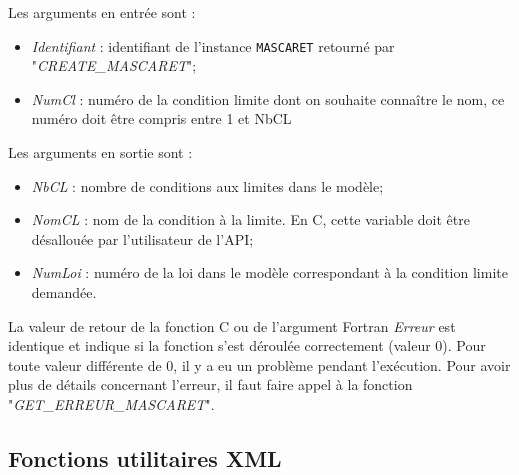 \documentclass[a4paper,11pt]{article}
\begin{document}
  Les arguments en entr\'ee sont :
 
 \vspace{0.5cm}
 
 \begin{itemize}
 
    \item \textit{Identifiant} : identifiant de l'instance \texttt{MASCARET} retourn\'e par "\textit{CREATE\_MASCARET}";
    
    \vspace{0.5cm}
    
    \item \textit{NumCl} : num\'ero de la condition limite dont on souhaite conna\^itre le nom, ce num\'ero doit \^etre compris entre 1 et NbCL
    
 \end{itemize}
 
 \vspace{0.5cm}
 
 Les arguments en sortie sont :

  \vspace{0.5cm}

  \begin{itemize}
  
     \item \textit{NbCL} : nombre de conditions aux limites dans le mod\`ele;
     \vspace{0.5cm}
     \item \textit{NomCL} : nom de la condition \`a la limite. En C, cette variable doit \^etre d\'esallou\'ee par l'utilisateur de l'API;  
     \vspace{0.5cm}
     \item \textit{NumLoi} : num\'ero de la loi dans le mod\`ele correspondant \`a la condition limite demand\'ee.  
     \vspace{0.5cm}
  \end{itemize}
  
  \vspace{0.5cm}
  
  La valeur de retour de la fonction C ou de l'argument Fortran \textit{Erreur} est identique et indique si la fonction s'est d\'eroul\'ee correctement (valeur 0). Pour toute valeur diff\'erente de 0, il y a eu un probl\`eme pendant l'ex\'ecution. Pour avoir plus de d\'etails concernant l'erreur, il faut faire appel \`a la fonction "\textit{GET\_ERREUR\_MASCARET}".

\subsection{Fonctions utilitaires XML}
\end{document}
